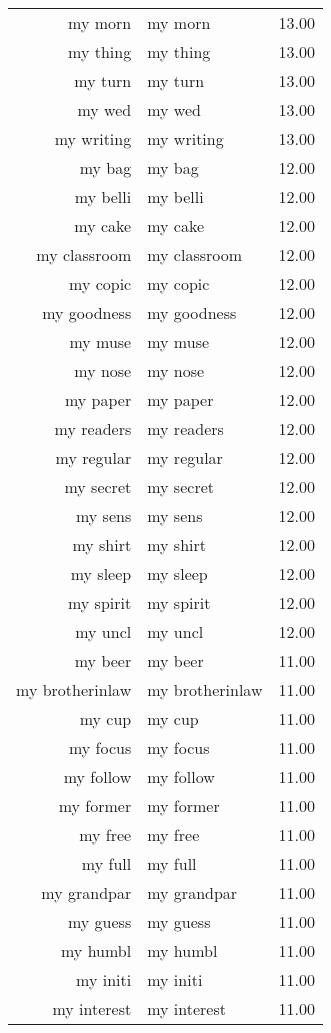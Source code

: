 \begin{table}[ht]
\begin{tabular}{rlr}
  my morn & my morn & 13.00 \\ 
  my thing & my thing & 13.00 \\ 
  my turn & my turn & 13.00 \\ 
  my wed & my wed & 13.00 \\ 
  my writing & my writing & 13.00 \\ 
  my bag & my bag & 12.00 \\ 
  my belli & my belli & 12.00 \\ 
  my cake & my cake & 12.00 \\ 
  my classroom & my classroom & 12.00 \\ 
  my copic & my copic & 12.00 \\ 
  my goodness & my goodness & 12.00 \\ 
  my muse & my muse & 12.00 \\ 
  my nose & my nose & 12.00 \\ 
  my paper & my paper & 12.00 \\ 
  my readers & my readers & 12.00 \\ 
  my regular & my regular & 12.00 \\ 
  my secret & my secret & 12.00 \\ 
  my sens & my sens & 12.00 \\ 
  my shirt & my shirt & 12.00 \\ 
  my sleep & my sleep & 12.00 \\ 
  my spirit & my spirit & 12.00 \\ 
  my uncl & my uncl & 12.00 \\ 
  my beer & my beer & 11.00 \\ 
  my brotherinlaw & my brotherinlaw & 11.00 \\ 
  my cup & my cup & 11.00 \\ 
  my focus & my focus & 11.00 \\ 
  my follow & my follow & 11.00 \\ 
  my former & my former & 11.00 \\ 
  my free & my free & 11.00 \\ 
  my full & my full & 11.00 \\ 
  my grandpar & my grandpar & 11.00 \\ 
  my guess & my guess & 11.00 \\ 
  my humbl & my humbl & 11.00 \\ 
  my initi & my initi & 11.00 \\ 
  my interest & my interest & 11.00 \\ 

\end{tabular}
\end{table}
